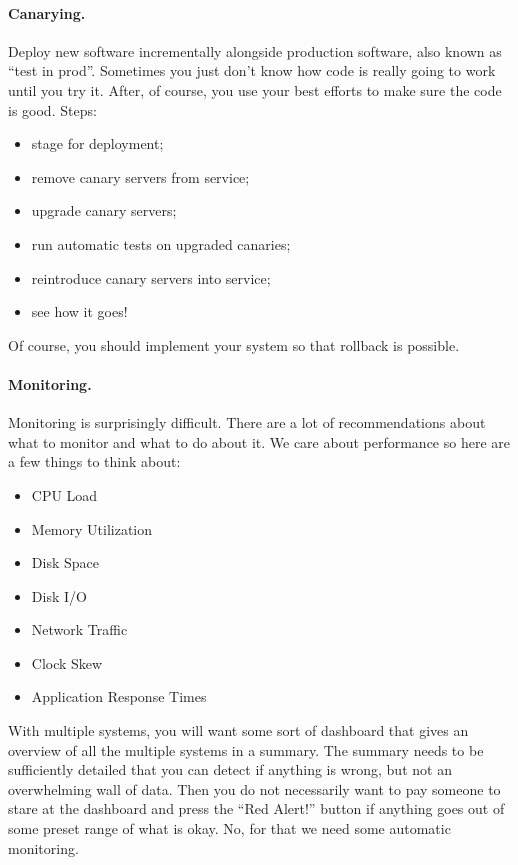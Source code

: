 \documentclass[a4paper]{report}
\begin{document}
\paragraph{Canarying.}
Deploy new software incrementally alongside production software, also known as ``test in prod''. Sometimes
you just don't know how code is really going to work until you try it. After, of course, you use your best
efforts to make sure the code is good. Steps:
\begin{itemize}
\item stage for deployment;
\item remove canary servers from service;
\item upgrade canary servers;
\item run automatic tests on upgraded canaries;
\item reintroduce canary servers into service;
\item see how it goes!
\end{itemize}
Of course, you should implement your system so that rollback is possible.

\paragraph{Monitoring.}

Monitoring is surprisingly difficult. There are a lot of recommendations about what to monitor and what to do about it. We care about performance so here are a few things to think about:

\begin{itemize}
	\item CPU Load
	\item Memory Utilization
	\item Disk Space
	\item Disk I/O
	\item Network Traffic
	\item Clock Skew
	\item Application Response Times
\end{itemize}

With multiple systems, you will want some sort of dashboard that gives an overview of all the multiple systems in a summary. The summary needs to be sufficiently detailed that you can detect if anything is wrong, but not an overwhelming wall of data. Then you do not necessarily want to pay someone to stare at the dashboard and press the  ``Red Alert!'' button if anything goes out of some preset range of what is okay. No, for that we need some automatic monitoring.
\end{document}
